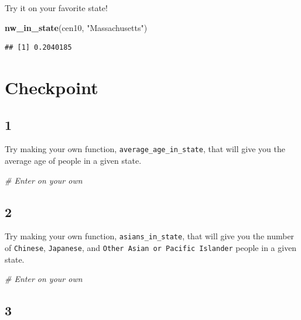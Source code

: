 \documentclass[]{book}
\newenvironment{Shaded}{\begin{snugshade}}{\end{snugshade}}
\newcommand{\KeywordTok}[1]{\textcolor[rgb]{0.13,0.29,0.53}{\textbf{#1}}}
\newcommand{\StringTok}[1]{\textcolor[rgb]{0.31,0.60,0.02}{#1}}
\newcommand{\CommentTok}[1]{\textcolor[rgb]{0.56,0.35,0.01}{\textit{#1}}}
\newcommand{\NormalTok}[1]{#1}
\theoremstyle{definition}
\theoremstyle{definition}
\theoremstyle{definition}
\theoremstyle{remark}
\begin{document}
Try it on your favorite state!

\begin{Shaded}
\begin{Highlighting}[]
\KeywordTok{nw_in_state}\NormalTok{(cen10, }\StringTok{"Massachusetts"}\NormalTok{)}
\end{Highlighting}
\end{Shaded}

\begin{verbatim}
## [1] 0.2040185
\end{verbatim}

\section*{Checkpoint}\label{checkpoint-1}

\subsection*{1}\label{section-14}

Try making your own function, \texttt{average\_age\_in\_state}, that
will give you the average age of people in a given state.

\begin{Shaded}
\begin{Highlighting}[]
\CommentTok{# Enter on your own}
\end{Highlighting}
\end{Shaded}

\subsection*{2}\label{section-15}

Try making your own function, \texttt{asians\_in\_state}, that will give
you the number of \texttt{Chinese}, \texttt{Japanese}, and
\texttt{Other\ Asian\ or\ Pacific\ Islander} people in a given state.

\begin{Shaded}
\begin{Highlighting}[]
\CommentTok{# Enter on your own}
\end{Highlighting}
\end{Shaded}

\subsection*{3}\label{section-16}
\end{document}
